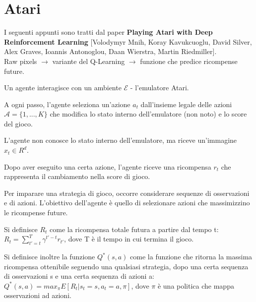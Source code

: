 \newpage

\section{Atari}

I seguenti appunti sono tratti dal paper \textbf{Playing Atari with Deep
Reinforcement Learning} [Volodymyr Mnih, Koray Kavukcuoglu, David Silver,
Alex Graves, Ioannis Antonoglou, Daan Wierstra, Martin Riedmiller].\\

Raw pixels $\rightarrow$ variante del Q-Learning $\rightarrow$ funzione
che predice ricompense future.

Un agente interagisce con un ambiente $\mathcal{E}$ - l'emulatore Atari.

A ogni passo, l'agente seleziona un'azione $a_t$ dall'insieme legale delle
azioni $\mathcal{A} = \{1,... ,K\}$ che modifica lo stato interno
dell'emulatore (non noto) e lo score del gioco.

L'agente non conosce lo stato interno dell'emulatore, ma riceve un'immagine
$x_t \in R^d$.

Dopo aver eseguito una certa azione, l'agente riceve una ricompensa
$r_t$ che rappresenta il cambiamento nella score di gioco.

Per imparare una strategia di gioco, occorre considerare sequenze di
osservazioni e di azioni. L'obiettivo dell'agente è quello di selezionare
azioni che massimizzino le ricompense future.

Si definisce $R_t$ come la ricompensa totale futura a partire dal tempo t:
$R_t = \sum_{t' = t}^T \gamma^{t' - t} r_{t'}$, dove T è il tempo in cui
termina il gioco.

Si definisce inoltre la funzione $Q^* (s,a)$ come la funzione che ritorna la
massima ricompensa ottenibile seguendo una qualsiasi strategia, dopo
una certa sequenza di osservazioni s e una certa sequenza di azioni a:
$Q^* (s,a) = max_{\pi} E [R_t | s_t = s, a_t = a, \pi]$, dove
$\pi$ è una politica che mappa osservazioni ad azioni.
